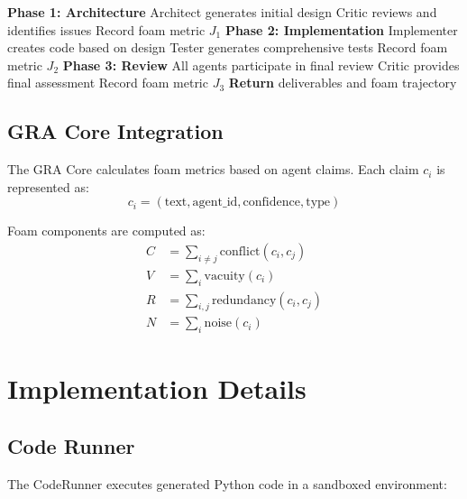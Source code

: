 \documentclass[12pt,a4paper]{article}
\begin{document}
\begin{algorithm}[H]
\caption{SoftwareOrchestrator Debate Flow}
\begin{algorithmic}[1]
\STATE \textbf{Phase 1: Architecture}
\STATE \quad Architect generates initial design
\STATE \quad Critic reviews and identifies issues
\STATE \quad Record foam metric $J_1$
\STATE
\STATE \textbf{Phase 2: Implementation}
\STATE \quad Implementer creates code based on design
\STATE \quad Tester generates comprehensive tests
\STATE \quad Record foam metric $J_2$
\STATE
\STATE \textbf{Phase 3: Review}
\STATE \quad All agents participate in final review
\STATE \quad Critic provides final assessment
\STATE \quad Record foam metric $J_3$
\STATE
\STATE \textbf{Return} deliverables and foam trajectory
\end{algorithmic}
\end{algorithm}

\subsection{GRA Core Integration}

The GRA Core calculates foam metrics based on agent claims. Each claim $c_i$ is represented as:
\begin{equation}
c_i = (\text{text}, \text{agent\_id}, \text{confidence}, \text{type})
\end{equation}

Foam components are computed as:
\begin{align}
C &= \sum_{i \neq j} \text{conflict}(c_i, c_j) \\
V &= \sum_i \text{vacuity}(c_i) \\
R &= \sum_{i,j} \text{redundancy}(c_i, c_j) \\
N &= \sum_i \text{noise}(c_i)
\end{align}

\section{Implementation Details}

\subsection{Code Runner}

The CodeRunner executes generated Python code in a sandboxed environment:
\end{document}
